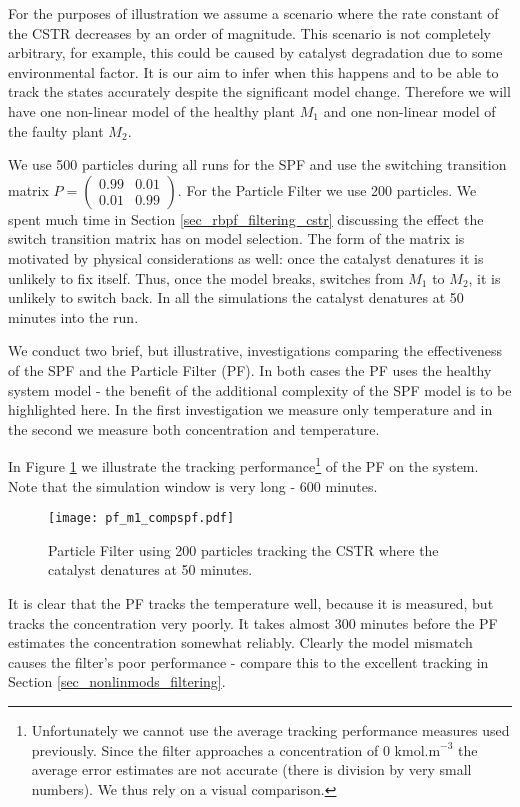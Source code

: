 For the purposes of illustration we assume a scenario where the rate constant of the CSTR decreases by an order of magnitude. This scenario is not completely arbitrary, for example, this could be caused by catalyst degradation due to some environmental factor. It is our aim to infer when this happens and to be able to track the states accurately despite the significant model change. Therefore we will have one non-linear model of the healthy plant $M_1$ and one non-linear model of the faulty plant $M_2$. 

We use 500 particles during all runs for the SPF and use the switching transition matrix $P=\begin{pmatrix}
0.99 & 0.01 \\ 0.01 & 0.99
\end{pmatrix}$. For the Particle Filter we use 200 particles. We spent much time in Section \ref{sec_rbpf_filtering_cstr} discussing the effect the switch transition matrix has on model selection. The form of the matrix is motivated by physical considerations as well: once the catalyst denatures it is unlikely to fix itself. Thus, once the model breaks, switches from $M_1$ to $M_2$, it is unlikely to switch back. In all the simulations the catalyst denatures at 50 minutes into the run.

We conduct two brief, but illustrative, investigations comparing the effectiveness of the SPF and the Particle Filter (PF). In both cases the PF uses the healthy system model - the benefit of the additional complexity of the SPF model is to be highlighted here. In the first investigation we measure only temperature and in the second we measure both concentration and temperature. 

In Figure \ref{fig_pf_m1_compspf} we illustrate the tracking performance\footnote{Unfortunately we cannot use the average tracking performance measures used previously. Since the filter approaches a concentration of 0 $\text{kmol.m}^{-3}$ the average error estimates are not accurate (there is division by very small numbers). We thus rely on a visual comparison.} of the PF on the system. Note that the simulation window is very long - 600 minutes.
\begin{figure}[H] 
\centering
\texttt{[image: pf\_m1\_compspf.pdf]}
\caption{Particle Filter using 200 particles tracking the CSTR where the catalyst denatures at 50 minutes.}
\label{fig_pf_m1_compspf}
\end{figure}
It is clear that the PF tracks the temperature well, because it is measured, but tracks the concentration very poorly. It takes almost 300 minutes before the PF estimates the concentration somewhat reliably. Clearly the model mismatch causes the filter's poor performance - compare this to the excellent tracking in Section \ref{sec_nonlinmods_filtering}.

